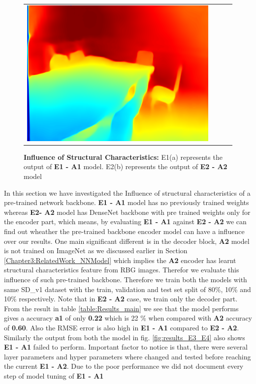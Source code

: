 \begin{figure}[h]
\begin{tabular}{@{}c@{ }c@{ }c@{ }c@{}}
\includegraphics[width=.3\linewidth]{Figures/results/s1_a1/0Predicted.png}\\[-1ex]
\end{tabular}
\caption{\textbf{Influence of Structural Characteristics:} E1(a) represents the output of \textbf{E1 - A1} model. E2(b) represents the output of \textbf{E2 - A2} model  }%
\label{fig:results_E1_E2}
\end{figure}

\label{Chapter6:Influence_Structural_Char}
In this section we have investigated the Influence of structural characteristics of a pre-trained network backbone. \textbf{E1 - A1} model has no previously trained weights whereas \textbf{E2- A2} model has DenseNet backbone with pre trained weights only for the encoder part, which means, by evaluating \textbf{E1 - A1} against \textbf{E2 - A2} we can find out wheather the pre-trained backbone encoder model can have a influence over our results. One main significant different is in the decoder block, \textbf{A2} model is not trained on ImageNet as we discussed earlier in Section \ref{Chapter3:RelatedWork_NNModel} which implies the \textbf{A2} encoder has learnt structural characteristics feature from RBG images. Therefor we evaluate this influence of such pre-trained backbone. Therefore we train both the models with same SD\_v1 dataset with the train, validation and test set split of 80\%, 10\%  and 10\% respectively. Note that in \textbf{E2 - A2} case, we train only the decoder part. From the result in table \ref{table:Results_main} we see that the model performs gives a accuracy \textbf{a1} of only \textbf{0.22} which is 22 \% when compared with \textbf{A2} accuracy of \textbf{0.60}. Also the RMSE error is also high in \textbf{E1 - A1} compared to \textbf{E2 - A2}. Similarly the output from both the model in fig. \ref{fig:results_E3_E4} also shows  \textbf{E1 - A1} failed to perform. Important factor to notice is that, there were several layer parameters and hyper parameters where changed and tested before reaching the current \textbf{E1 - A2}. Due to the poor performance we did not document every step of model tuning of \textbf{E1 - A1} 


